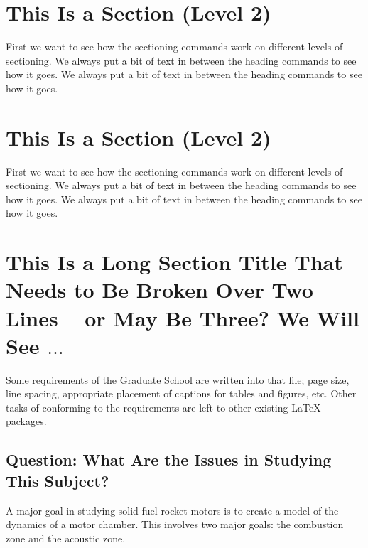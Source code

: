 

\section{This Is a Section (Level 2)}

First we want to see how the sectioning commands work on different
levels of sectioning.
We always put a bit of text in between the heading commands to see how it goes.
We always put a bit of text in between the heading commands to see how it goes.

\section{This Is a Section (Level 2)}

First we want to see how the sectioning commands work on different
levels of sectioning.
We always put a bit of text in between the heading commands to see how it goes.
We always put a bit of text in between the heading commands to see how it goes.

\section{This Is a Long Section Title That Needs to Be Broken Over
 Two Lines -- or May Be Three? We Will See $\ldots$}

Some requirements of the Graduate School are written
into that file; page size, line spacing, appropriate
placement of captions for tables and figures, etc.
Other tasks of conforming to the requirements are
left to other existing \LaTeX{} packages.

\subsection{Question:  What Are the Issues in Studying This Subject?}

A major goal in studying solid fuel rocket motors is to create a model
of the dynamics of a motor chamber.  This involves two major goals:
the combustion zone and the acoustic zone.

